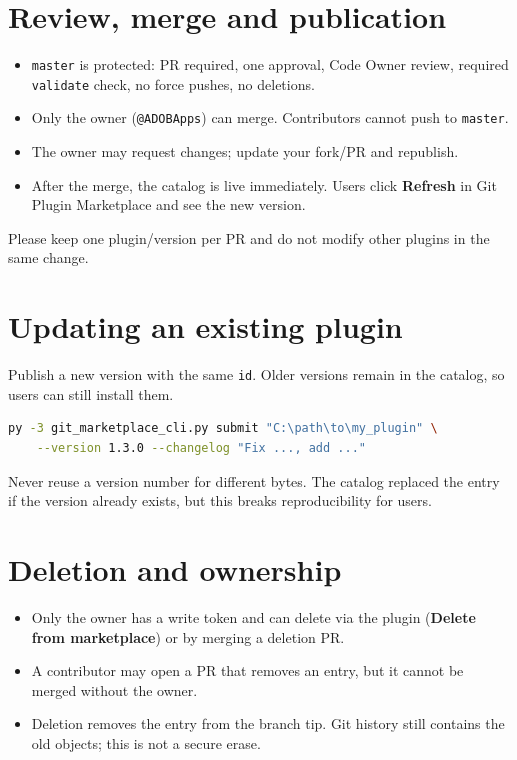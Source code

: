 \documentclass[11pt,a4paper]{article}
\newcommand{\code}[1]{\texttt{#1}}
\begin{document}
\section{Review, merge and publication}

\begin{itemize}[leftmargin=1.5em]
  \item \code{master} is protected: PR required, one approval, Code Owner
        review, required \code{validate} check, no force pushes, no deletions.
  \item Only the owner (\code{@ADOBApps}) can merge. Contributors cannot push to
        \code{master}.
  \item The owner may request changes; update your fork/PR and republish.
  \item After the merge, the catalog is live immediately. Users click
        \textbf{Refresh} in Git Plugin Marketplace and see the new version.
\end{itemize}

Please keep one plugin/version per PR and do not modify other plugins in the same
change.

\section{Updating an existing plugin}

Publish a new version with the same \code{id}. Older versions remain in the
catalog, so users can still install them.

\begin{lstlisting}[language=bash,caption={Publishing an update}]
py -3 git_marketplace_cli.py submit "C:\path\to\my_plugin" \
    --version 1.3.0 --changelog "Fix ..., add ..."
\end{lstlisting}

Never reuse a version number for different bytes. The catalog replaced the
entry if the version already exists, but this breaks reproducibility for users.

\section{Deletion and ownership}

\begin{itemize}[leftmargin=1.5em]
  \item Only the owner has a write token and can delete via the plugin
        (\textbf{Delete from marketplace}) or by merging a deletion PR.
  \item A contributor may open a PR that removes an entry, but it cannot be
        merged without the owner.
  \item Deletion removes the entry from the branch tip. Git history still
        contains the old objects; this is not a secure erase.
\end{itemize}
\end{document}
